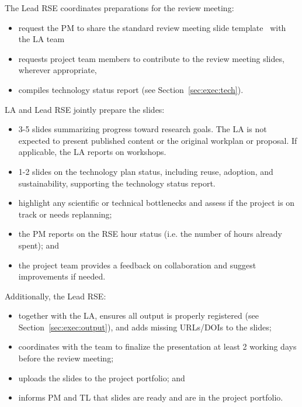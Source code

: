 The Lead RSE coordinates preparations for the review meeting:
\begin{itemize}\itemsep0em
\item request the PM to share the standard review meeting slide template~\cite{proj-portfolio} with the LA team
\item requests project team members to contribute to the review meeting slides, wherever appropriate,
\item compiles technology status report (see Section~\ref{sec:exec:tech}).
\end{itemize}


LA and Lead RSE jointly prepare the slides:
\begin{itemize}\itemsep0em
\item 3-5 slides summarizing progress toward research goals. The LA is not expected to present published content or the
original workplan or proposal. If applicable, the LA reports on workshops.
\item 1-2 slides on the technology plan status, including reuse, adoption, and sustainability, supporting the technology status report.
\item highlight any scientific or technical bottlenecks and assess if the project is on track or needs replanning;
\item the PM reports on the RSE hour status (i.e. the number of hours already spent); and
\item the project team provides a feedback on collaboration and suggest improvements if needed.
\end{itemize}
 
Additionally, the Lead RSE:
\begin{itemize}\itemsep0em
\item together with the LA, ensures all output is properly registered (see Section~\ref{sec:exec:output}), and adds missing URLs/DOIs to the slides;
\item coordinates with the team to finalize the presentation at least 2 working days before the review meeting;
\item uploads the slides to the project portfolio; and
\item informs PM and TL that slides are ready and are in the project portfolio.
\end{itemize}

